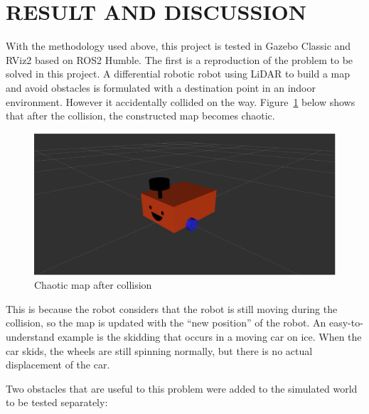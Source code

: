 \section{RESULT AND DISCUSSION}
\label{sec:result_and_discussion}
With the methodology used above, this project is tested in Gazebo Classic and RViz2 based on ROS2 Humble. 
The first is a reproduction of the problem to be solved in this project.
A differential robotic robot using LiDAR to build a map and avoid obstacles is formulated 
with a destination point in an indoor environment. However it accidentally collided on the way. 
Figure~\ref{fig:collision} below shows that after the collision, the constructed map becomes chaotic.
\begin{figure}[H]
    \centering
    \includegraphics[width=0.8\linewidth]{figs/robot.png}
    \caption{Chaotic map after collision}
    \label{fig:collision}
\end{figure}
This is because the robot considers that the robot is still moving during the collision,
so the map is updated with the ``new position'' of the robot. An easy-to-understand example is the skidding that occurs in a moving car on ice. 
When the car skids, the wheels are still spinning normally, but there is no actual displacement of the car.

Two obstacles that are useful to this problem were added to the simulated world to be tested separately:

